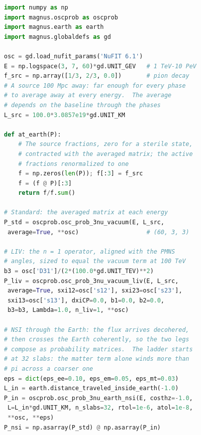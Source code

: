 \documentclass[final,5p,times,twocolumn,sort,compress]{elsarticle}
\makeatletter
\newcommand{\eq}{Eq.}
\newcommand{\fig}{Fig.}
\DeclareRobustCommand{\_}{%
  \ifmmode\nfss@text{\textunderscore}\else\textunderscore\allowbreak\fi}
\newcommand{\equ}[1]{\eq~(\ref{equ:#1})}
\newcommand{\figu}[1]{\fig~\ref{fig:#1}}
\makeatother
\begin{document}
\begin{lstlisting}[language=Python, caption={\textbf{Flavor composition of astrophysical neutrinos.} The five cases of \figu{astro}: the phase-averaged matrix $\langle P_{\nu_\alpha \to \nu_\beta}\rangle$ of \equ{averaged} for each Hamiltonian, over the sixty energies of the figure, contracted with the pion-decay source fractions. The standard, Lorentz-violating, and $3+1$ cases are one wrapper call each with {\tt average=True}; the NSI case composes the averaged vacuum matrix with one propagation through the core; the pseudo-Dirac case is one call to {\tt osc\_prob\_pseudo\_dirac\_vacuum}, which forms each pair's phase from its splitting. {\tt f\_earth} holds the five compositions. See Sec.~\ref{sec:astro} for details.}, label={lst:astro}, float=t]
import numpy as np
import magnus.oscprob as oscprob
import magnus.earth as earth
import magnus.globaldefs as gd

osc = gd.load_nufit_params('NuFIT 6.1')
E = np.logspace(3, 7, 60)*gd.UNIT_GEV   # 1 TeV-10 PeV
f_src = np.array([1/3, 2/3, 0.0])       # pion decay
# A source 100 Mpc away: far enough for every phase
# to average away at every energy.  The average
# depends on the baseline through the phases
L_src = 100.0*3.0857e19*gd.UNIT_KM

def at_earth(P):
    # The source fractions, zero for a sterile state,
    # contracted with the averaged matrix; the active
    # fractions renormalized to one
    f = np.zeros(len(P)); f[:3] = f_src
    f = (f @ P)[:3]
    return f/f.sum()

# Standard: the averaged matrix at each energy
P_std = oscprob.osc_prob_3nu_vacuum(E, L_src,
 average=True, **osc)                   # (60, 3, 3)

# LIV: the n = 1 operator, aligned with the PMNS
# angles, sized to equal the vacuum term at 100 TeV
b3 = osc['D31']/(2*(100.0*gd.UNIT_TEV)**2)
P_liv = oscprob.osc_prob_3nu_vacuum_liv(E, L_src,
 average=True, sxi12=osc['s12'], sxi23=osc['s23'],
 sxi13=osc['s13'], dxiCP=0.0, b1=0.0, b2=0.0,
 b3=b3, Lambda=1.0, n_liv=1, **osc)

# NSI through the Earth: the flux arrives decohered,
# then crosses the Earth coherently, so the two legs
# compose as probability matrices.  The ladder starts
# at 32 slabs: the matter term alone winds more than
# pi across a coarser one
eps = dict(eps_ee=0.10, eps_em=0.05, eps_mt=0.03)
L_in = earth.distance_traveled_inside_earth(-1.0)
P_in = oscprob.osc_prob_3nu_earth_nsi(E, costhz=-1.0,
 L=L_in*gd.UNIT_KM, n_slabs=32, rtol=1e-6, atol=1e-8,
 **osc, **eps)
P_nsi = np.asarray(P_std) @ np.asarray(P_in)


\end{lstlisting}
\end{document}
